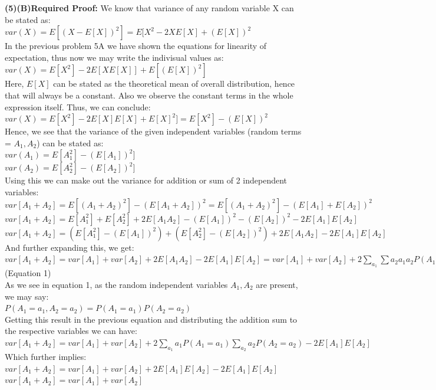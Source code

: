 \documentclass[11pt]{article}
\renewcommand\part[1]{\vspace{.10in}\textbf{(#1)}}
\begin{document}
\part{5}\textbf{(B)}\textbf {Required Proof:} We know that variance of any random variable X can be stated as:\\
$var(X) = E[(X - E[X])^2] = E[X^2 - 2XE[X] + (E[X])^2$\\
In the previous problem 5A we have shown the equations for linearity of expectation, thus now we may write the indivisual values as:\\
$var(X) = E[X^2] - 2E[XE[X]] + E[(E[X])^2]$\\
Here, $E[X]$ can be stated as the theoretical mean of overall distribution, hence that will always be a constant. Also we observe the constant terms in the whole expression itself. Thus, we can conclude:\\
$var(X) = E[X^2] - 2E[X]E[X] + E[X]^2] = E[X^2] - (E[X])^2$\\
Hence, we see that the variance of the given independent variables (random terms = $A_1,A_2$) can be stated as:\\
$var(A_1) = E[A_1^2] - (E[A_1])^2]$\\
$var(A_2) = E[A_2^2] - (E[A_2])^2]$\\
Using this we can make out the variance for addition or sum of 2 independent variables:\\
$var[A_1 + A_2] = E[(A_1 + A_2)^2] - (E[A_1 + A_2])^2 = E[(A_1 + A_2)^2] - (E[A_1] + E[A_2])^2$\\
$var[A_1 + A_2] = E[A_1^2] + E[A_2^2] +2E[A_1A_2] - (E[A_1])^2 - (E[A_2])^2 - 2E[A_1]E[A_2]$\\
$var[A_1 + A_2] = (E[A_1^2] - (E[A_1])^2) + (E[A_2^2] - (E[A_2])^2) + 2E[A_1A_2] - 2E[A_1]E[A_2]$\\
And further expanding this, we get:\\

$var[A_1 + A_2] = var[A_1] + var[A_2] + 2E[A_1A_2] - 2E[A_1]E[A_2] = var[A_1] + var[A_2] + 2\sum_{a_1}\sum{a_2}a_1a_2P(A_1 = a_1,A_2 = a_2) - 2E[A_1]E[A_2]$ (Equation 1)\\

As we see in equation 1, as the random independent variables $A_1,A_2$ are present, we may say:\\
$P(A_1=a_1, A_2=a_2) = P(A_1=a_1)P(A_2=a_2)$\\

Getting this result in the previous equation and distributing the addition sum to the respective variables we can have:\\
$var[A_1 + A_2] = var[A_1] + var[A_2] + 2\sum_{a_1}a_1P(A_1=a_1)\sum_{a_2}a_2P(A_2 = a_2) - 2E[A_1]E[A_2]$\\
Which further implies:\\
$var[A_1 + A_2] = var[A_1] + var[A_2] + 2E[A_1]E[A_2] - 2E[A_1]E[A_2]$\\
$var[A_1 + A_2] = var[A_1] + var[A_2]$\\
\end{document}

